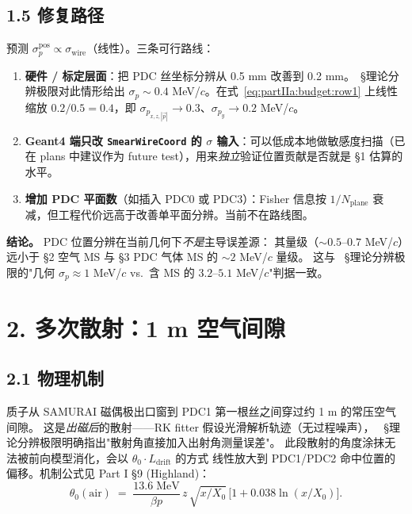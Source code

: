 \subsection*{1.5 修复路径}

预测 $\sigma_p^\mathrm{pos}\propto\sigma_\mathrm{wire}$（线性）。三条可行路线：
\begin{enumerate}
  \item \textbf{硬件 / 标定层面}：把 PDC 丝坐标分辨从 0.5 mm 改善到 0.2 mm。\StatusReport{}~§理论分辨极限对此情形给出 $\sigma_p\sim 0.4$ MeV/$c$。在式~\eqref{eq:partIIa:budget:row1} 上线性缩放 $0.2/0.5=0.4$，即 $\sigma_{p_{x,z,|\vec p|}}\to 0.3$、$\sigma_{p_y}\to 0.2$ MeV/$c$。
  \item \textbf{Geant4 端只改 \texttt{SmearWireCoord} 的 $\sigma$ 输入}：可以低成本地做敏感度扫描（已在 plans 中建议作为 future test），用来\emph{独立}验证位置贡献是否就是 §1 估算的水平。
  \item \textbf{增加 PDC 平面数}（如插入 PDC0 或 PDC3）：Fisher 信息按 $1/N_\mathrm{plane}$ 衰减，但工程代价远高于改善单平面分辨。当前不在路线图。
\end{enumerate}

\textbf{结论。} PDC 位置分辨在当前几何下\emph{不是}主导误差源：
其量级（$\sim 0.5$--$0.7$ MeV/$c$）远小于 §2 空气 MS 与 §3 PDC 气体 MS 的 $\sim 2$ MeV/$c$ 量级。
这与 \StatusReport{}~§理论分辨极限的"几何 $\sigma_p \approx 1$ MeV/$c$ vs.~含 MS 的 $3.2$--$5.1$ MeV/$c$"判据一致。

\section{2. 多次散射：1 m 空气间隙}
\label{sec:partIIa:budget:air-ms}

\subsection*{2.1 物理机制}

质子从 SAMURAI 磁偶极出口窗到 PDC1 第一根丝之间穿过约 1 m 的常压空气间隙。
这是\emph{出磁后}的散射——RK fitter 假设光滑解析轨迹（无过程噪声），
\StatusReport{}~§理论分辨极限明确指出"散射角直接加入出射角测量误差"。
此段散射的角度涂抹无法被前向模型消化，会以 $\theta_0\cdot L_\mathrm{drift}$ 的方式
线性放大到 PDC1/PDC2 命中位置的偏移。机制公式见 Part I §9 (Highland)：
\begin{equation}
  \theta_0(\text{air}) \;=\; \frac{13.6\;\mathrm{MeV}}{\beta p}\,
       z\,\sqrt{x/X_0}\,
       \bigl[1 + 0.038\ln(x/X_0)\bigr].
  \label{eq:partIIa:budget:highland-air}
\end{equation}

